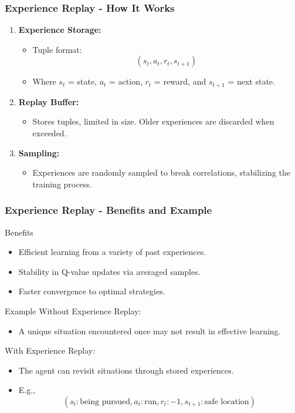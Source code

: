 \documentclass[aspectratio=169]{beamer}
\begin{document}
\begin{frame}[fragile]
    \frametitle{Experience Replay - How It Works}
    \begin{enumerate}
        \item \textbf{Experience Storage:}
        \begin{itemize}
            \item Tuple format: 
            \[
            (s_t, a_t, r_t, s_{t+1})
            \]
            \item Where \(s_t\) = state, \(a_t\) = action, \(r_t\) = reward, and \(s_{t+1}\) = next state.
        \end{itemize}
        
        \item \textbf{Replay Buffer:}
        \begin{itemize}
            \item Stores tuples, limited in size. Older experiences are discarded when exceeded.
        \end{itemize}
        
        \item \textbf{Sampling:}
        \begin{itemize}
            \item Experiences are randomly sampled to break correlations, stabilizing the training process.
        \end{itemize}
    \end{enumerate}
\end{frame}

\begin{frame}[fragile]
    \frametitle{Experience Replay - Benefits and Example}
    \begin{block}{Benefits}
        \begin{itemize}
            \item Efficient learning from a variety of past experiences.
            \item Stability in Q-value updates via averaged samples.
            \item Faster convergence to optimal strategies.
        \end{itemize}
    \end{block}
    
    \begin{block}{Example}
        Without Experience Replay:
        \begin{itemize}
            \item A unique situation encountered once may not result in effective learning.
        \end{itemize}
        With Experience Replay:
        \begin{itemize}
            \item The agent can revisit situations through stored experiences.
            \item E.g., 
            \[
            (s_t: \text{being pursued}, a_t: \text{run}, r_t: -1, s_{t+1}: \text{safe location})
            \]
        \end{itemize}
    \end{block}
    
\end{frame}
\end{document}
